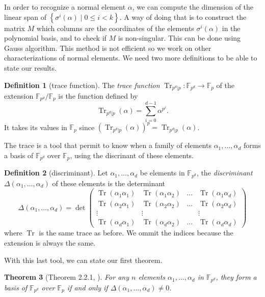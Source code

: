 \documentclass[a4paper,11pt]{article}
\theoremstyle{break}
\newtheorem{thm}{Theorem}[section]
\theoremstyle{sc}
\theoremstyle{definition}
\newtheorem{defi}[thm]{Definition}
\theoremstyle{remark}
\DeclareMathOperator{\Tr}{Tr}
\begin{document}
In order to recognize a normal element $\alpha$, we can compute the dimension of the
linear span of $\left\{ \sigma^i(\alpha) \;|\; 0\leq i < k \right\}$. A way of
doing that is to construct the matrix $M$ which columns are the coordinates of the
elements $\sigma^i(\alpha)$ in the polynomial basis, and to check if $M$ is
non-singular. This can be done using Gauss algorithm. This method is not
efficient so we work on other characterizations of normal elements. We need
two more definitions to be able to state our results.

\begin{defi}[trace function]
  The \emph{trace function}
  $\Tr_{p^d|p}:\mathbb{F}_{p^d}\to\mathbb{F}_p$ of the extension
$\mathbb{F}_{p^d}/\mathbb{F}_p$ is the function defined by
\[
  \Tr_{p^d|p}(\alpha) = \sum_{i=0}^{d-1}\alpha^{p^i}.
\]
It takes its values in $\mathbb{F}_p$ since $(\Tr_{p^d|p}(\alpha))^p
= \Tr_{p^d|p}(\alpha)$. 
\end{defi}

The trace is a tool that permit to know when a family of elements $\alpha_1,
\dots, \alpha_d$ forms a basis of $\mathbb{F}_{p^d}$ over
$\mathbb{F}_p$, using the discrinant of these elements.

\begin{defi}[discriminant]
  Let $\alpha_1, \dots, \alpha_d$ be elements in $\mathbb{F}_{p^d}$, the
  \emph{discriminant} $\Delta(\alpha_1, \dots, \alpha_d)$ of these elements
  is the determinant
  \[
    \Delta(\alpha_1, \dots, \alpha_d)=\det
    \begin{pmatrix}
      \Tr(\alpha_1\alpha_1) & \Tr(\alpha_1\alpha_2) & \dots &
      \Tr(\alpha_1\alpha_d) \\
      \Tr(\alpha_2\alpha_1) & \Tr(\alpha_2\alpha_2) & \dots &
      \Tr(\alpha_2\alpha_d) \\
      \vdots & \vdots & & \vdots \\
      \Tr(\alpha_d\alpha_1) & \Tr(\alpha_d\alpha_2) & \dots &
      \Tr(\alpha_d\alpha_d)
    \end{pmatrix}
  \]
  where $\Tr$ is the same trace as before. We ommit the indices because
  the extension is always the same.
\end{defi}

With this last tool, we can state our first theorem.

\begin{thm}[Theorem 2.2.1, \cite{Ga93}]
  For any $n$ elements $\alpha_1, \dots, \alpha_d$ in
  $\mathbb{F}_{p^d}$, they form a basis of $\mathbb{F}_{p^d}$ over
  $\mathbb{F}_p$ if and only if $\Delta(\alpha_1, \dots,
  \alpha_d)\neq0$.
\end{thm}
\end{document}
